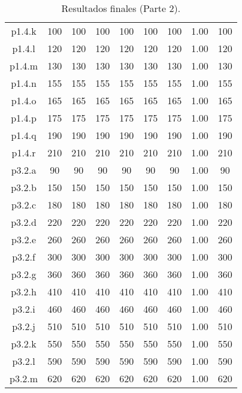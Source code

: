 \begin{table}
\begin{center}
\begin{tabular}{ |c|c|c|c|c|c|c|c|c| }
p1.4.k & 100 & 100 & 100 & 100 & 100 & 100 & 1.00 & 100 \\
p1.4.l & 120 & 120 & 120 & 120 & 120 & 120 & 1.00 & 120 \\
p1.4.m & 130 & 130 & 130 & 130 & 130 & 130 & 1.00 & 130 \\
p1.4.n & 155 & 155 & 155 & 155 & 155 & 155 & 1.00 & 155 \\
p1.4.o & 165 & 165 & 165 & 165 & 165 & 165 & 1.00 & 165 \\
p1.4.p & 175 & 175 & 175 & 175 & 175 & 175 & 1.00 & 175 \\
p1.4.q & 190 & 190 & 190 & 190 & 190 & 190 & 1.00 & 190 \\
p1.4.r & 210 & 210 & 210 & 210 & 210 & 210 & 1.00 & 210 \\
p3.2.a & 90 & 90 & 90 & 90 & 90 & 90 & 1.00 & 90 \\
p3.2.b & 150 & 150 & 150 & 150 & 150 & 150 & 1.00 & 150 \\
p3.2.c & 180 & 180 & 180 & 180 & 180 & 180 & 1.00 & 180 \\
p3.2.d & 220 & 220 & 220 & 220 & 220 & 220 & 1.00 & 220 \\
p3.2.e & 260 & 260 & 260 & 260 & 260 & 260 & 1.00 & 260 \\
p3.2.f & 300 & 300 & 300 & 300 & 300 & 300 & 1.00 & 300 \\
p3.2.g & 360 & 360 & 360 & 360 & 360 & 360 & 1.00 & 360 \\
p3.2.h & 410 & 410 & 410 & 410 & 410 & 410 & 1.00 & 410 \\
p3.2.i & 460 & 460 & 460 & 460 & 460 & 460 & 1.00 & 460 \\
p3.2.j & 510 & 510 & 510 & 510 & 510 & 510 & 1.00 & 510 \\
p3.2.k & 550 & 550 & 550 & 550 & 550 & 550 & 1.00 & 550 \\
p3.2.l & 590 & 590 & 590 & 590 & 590 & 590 & 1.00 & 590 \\
p3.2.m & 620 & 620 & 620 & 620 & 620 & 620 & 1.00 & 620 \\
\hline
\end{tabular}
\end{center}
\caption{Resultados finales (Parte 2).}
\label{tab:resultadosFinales2}
\end{table}



